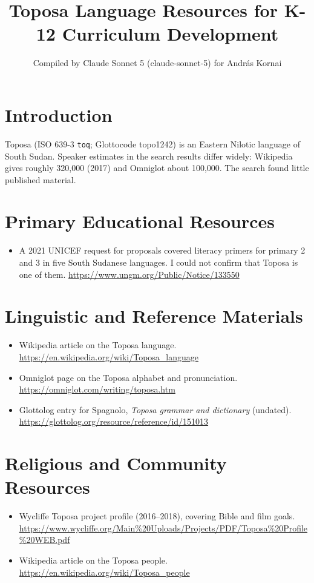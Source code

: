 \documentclass[12pt]{article}
\title{Toposa Language Resources for K-12 Curriculum Development}
\author{Compiled by Claude Sonnet 5 (claude-sonnet-5) for Andr\'as Kornai}
\date{}
\begin{document}
\maketitle

\section{Introduction}
Toposa (ISO 639-3 \texttt{toq}; Glottocode topo1242) is an Eastern Nilotic language of South Sudan. Speaker estimates in the search results differ widely: Wikipedia gives roughly 320,000 (2017) and Omniglot about 100,000. The search found little published material.

\section{Primary Educational Resources}
\begin{itemize}
\item A 2021 UNICEF request for proposals covered literacy primers for primary 2 and 3 in five South Sudanese languages. I could not confirm that Toposa is one of them. \url{https://www.ungm.org/Public/Notice/133550}
\end{itemize}

\section{Linguistic and Reference Materials}
\begin{itemize}
\item Wikipedia article on the Toposa language. \url{https://en.wikipedia.org/wiki/Toposa_language}
\item Omniglot page on the Toposa alphabet and pronunciation. \url{https://omniglot.com/writing/toposa.htm}
\item Glottolog entry for Spagnolo, \emph{Toposa grammar and dictionary} (undated). \url{https://glottolog.org/resource/reference/id/151013}
\end{itemize}

\section{Religious and Community Resources}
\begin{itemize}
\item Wycliffe Toposa project profile (2016--2018), covering Bible and film goals. \url{https://www.wycliffe.org/Main%20Uploads/Projects/PDF/Toposa%20Profile%20WEB.pdf}
\item Wikipedia article on the Toposa people. \url{https://en.wikipedia.org/wiki/Toposa_people}
\end{itemize}
\end{document}
